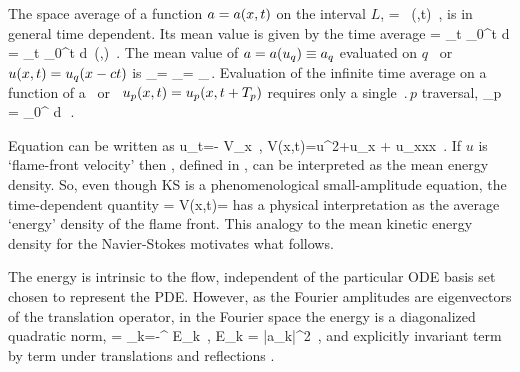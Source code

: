 The {space average} of a function $a = a(x,t)$  on
the interval $L$,
\beq
    \expct{\obser} = \Lint{\pSpace}\, \obser(\pSpace,t)
    \,,
    \label{rpo:spac_ave}
\eeq
is in general time dependent.
Its mean value is given by the {time average}
\beq
\timeAver{\obser}
    =
\lim_{t\rightarrow \infty}  \int_0^t \! d\tau \, \expct{\obser}
    =
\lim_{t\rightarrow \infty}  \int_0^t \!
    \Lint{\tau}  d\pSpace\, \obser(\pSpace,\tau)
    \,.
\label{rpo:tim_ave}
\eeq
The mean value
of $a = a(u_q) \equiv a_q$ evaluated on $q$
\eqv\ or {\reqv} $u(x,t) = u_q(x-ct)$ is
\beq
\timeAver{\obser}_\stagn = \expct{\obser}_\stagn = \obser_\stagn\,.
\label{rpo:u-eqv} \eeq Evaluation of the infinite time average
 on a function of a \po\ or \rpo\
$u_p(x,t)=u_p(x,t+{T_{p}})$ requires only a single
$\period{p}$ traversal,
\beq
  \timeAver{\obser}_p = 
    \int_0^{\period{p}} \! d\tau \, \expct{\obser}
\,.
\label{rpo:u-cyc}
\eeq

Equation  can be written as %
\beq
    u_t=- V_x
        \,,\qquad
    V(x,t)={\textstyle{}}u^2+u_{x} + u_{xxx}
    \,.
 If $u$ is `flame-front velocity' then \expctE, defined in
\refeq{eq:stdks}, can be interpreted as the mean energy density.
%
So, even though KS is a phenomenological
small-amplitude equation, the time-dependent quantity
\beq
    \expctE=
  \Lint{\pSpace}
  V(x,t)=
  \Lint{\pSpace} 
  \label{ksEnergy} \eeq
has a physical interpretation as the average `energy'
density of the flame front. This analogy to the mean kinetic energy
density for the Navier-Stokes motivates what follows.

The energy  is intrinsic to
the flow, independent of the particular ODE basis set
chosen to represent the PDE. However, as the Fourier
amplitudes are eigenvectors of the translation operator,
in the Fourier space the energy is a diagonalized
quadratic norm,
\beq
\expctE   %
          =  \sum_{k=-\infty}^{\infty} E_k
\,,\qquad
E_k = %
    {\textstyle{}}|a_k|^2
\,,
and explicitly invariant term by term
under translations 
and reflections .

